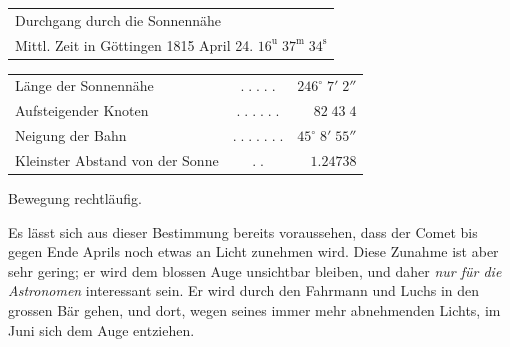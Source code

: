 \begin{center}\fontsize{10}{12}\selectfont\setlength{\tabcolsep}{3pt}\renewcommand{\arraystretch}{1.15}\begin{tabular}{l}
Durchgang durch die Sonnennähe\\
\quad Mittl. Zeit in Göttingen 1815 April 24. $16^{\mathrm u}\;37^{\mathrm m}\;34^{\mathrm s}$\\
\end{tabular}\end{center}
\begin{center}\fontsize{10}{12}\selectfont\setlength{\tabcolsep}{3pt}\renewcommand{\arraystretch}{1.15}\begin{tabular}{lcr}
Länge der Sonnennähe & $.\;.\;.\;.\;.$ & $246^\circ\;7'\;2''$\\
Aufsteigender Knoten & $.\;.\;.\;.\;.\;.$ & $82\;43\;4$\\
Neigung der Bahn & $.\;.\;.\;.\;.\;.\;.$ & $45^\circ\;8'\;55''$\\
Kleinster Abstand von der Sonne & $.\;.$ & $1.24738$\\
\end{tabular}\end{center}
\noindent Bewegung rechtläufig.

\par\indent Es lässt sich aus dieser Bestimmung bereits voraussehen, dass der Comet bis gegen Ende Aprils noch etwas an Licht zunehmen wird. Diese Zunahme ist aber sehr gering; er wird dem blossen Auge unsichtbar bleiben, und daher \emph{nur für die Astronomen} interessant sein. Er wird durch den Fahrmann und Luchs in den grossen Bär gehen, und dort, wegen seines immer mehr abnehmenden Lichts, im Juni sich dem Auge entziehen.

